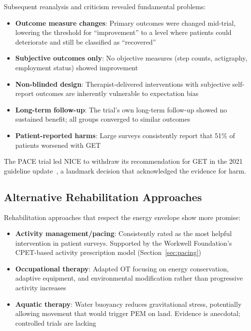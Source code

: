 Subsequent reanalysis and criticism revealed fundamental problems:

\begin{itemize}
    \item \textbf{Outcome measure changes}: Primary outcomes were changed mid-trial, lowering the threshold for ``improvement'' to a level where patients could deteriorate and still be classified as ``recovered''~\cite{Wilshire2018}
    \item \textbf{Subjective outcomes only}: No objective measures (step counts, actigraphy, employment status) showed improvement
    \item \textbf{Non-blinded design}: Therapist-delivered interventions with subjective self-report outcomes are inherently vulnerable to expectation bias~\cite{geraghty2019cognitive}
    \item \textbf{Long-term follow-up}: The trial's own long-term follow-up showed no sustained benefit; all groups converged to similar outcomes
    \item \textbf{Patient-reported harms}: Large surveys consistently report that 51\% of patients worsened with GET~\cite{Kindlon2011GET}
\end{itemize}

The PACE trial led NICE to withdraw its recommendation for GET in the 2021 guideline update~\cite{NICE2021mecfs}, a landmark decision that acknowledged the evidence for harm.

\subsection{Alternative Rehabilitation Approaches}

Rehabilitation approaches that respect the energy envelope show more promise:

\begin{itemize}
    \item \textbf{Activity management/pacing}: Consistently rated as the most helpful intervention in patient surveys. Supported by the Workwell Foundation's CPET-based activity prescription model (Section~\ref{sec:pacing})
    \item \textbf{Occupational therapy}: Adapted OT focusing on energy conservation, adaptive equipment, and environmental modification rather than progressive activity increases
    \item \textbf{Aquatic therapy}: Water buoyancy reduces gravitational stress, potentially allowing movement that would trigger PEM on land. Evidence is anecdotal; controlled trials are lacking
\end{itemize}

